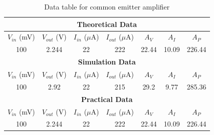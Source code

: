 \documentclass[12pt]{article}
\begin{document}
\bgroup
\def\arraystretch{1.5}
\begin{table}[h!]
    \centering
    \caption{Data table for common emitter amplifier}
    \label{tab:CE table}
    \begin{tabular}{|c|c|c|c|c|c|c|}
        \hline
        \multicolumn{7}{|c|}{\textbf{Theoretical Data}} \\
        \hline
        $V_{in}$ (mV) & $V_{out}$ (V) & $I_{in}$ ($\mu$A) & $I_{out}$ ($\mu$A) & $A_V$ & $A_I$ & $A_P$ \\ \hline
        100 & 2.244 & 22 & 222 & 22.44 & 10.09 & 226.44 \\ \hline\hline
        \multicolumn{7}{|c|}{\textbf{Simulation Data}} \\
        \hline
        $V_{in}$ (mV) & $V_{out}$ (V) & $I_{in}$ ($\mu$A) & $I_{out}$ ($\mu$A) & $A_V$ & $A_I$ & $A_P$ \\ \hline
        100 & 2.92 & 22 & 215 & 29.2 & 9.77 & 285.36 \\ \hline\hline
        \multicolumn{7}{|c|}{\textbf{Practical Data}} \\
        \hline
        $V_{in}$ (mV) & $V_{out}$ (V) & $I_{in}$ ($\mu$A) & $I_{out}$ ($\mu$A) & $A_V$ & $A_I$ & $A_P$ \\ \hline
        100 & 2.244 & 22 & 222 & 22.44 & 10.09 & 226.44 \\ \hline
    \end{tabular}
\end{table}
\egroup
\end{document}
